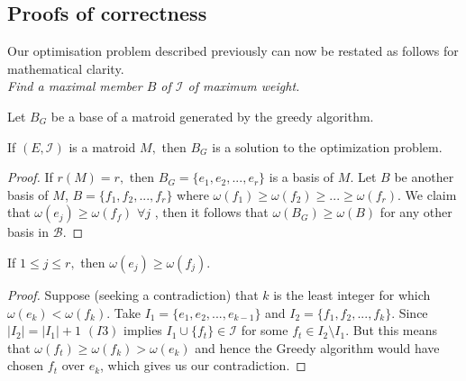 \documentclass[../main.tex]{subfiles}
\begin{document}
\subsection{Proofs of correctness}
Our optimisation problem described previously can now be restated as follows for mathematical clarity.\\
\noindent\Problem \textit{Find a maximal member $B$ of $\mathcal{I}$ of maximum weight.}
\begin{note}
Let $B_G$ be a base of a matroid generated by the greedy algorithm.
\end{note}
\begin{thm}\cite{ox_book}
If $(E,\mathcal{I})$ is a matroid $M,$ then $B_G$ is a solution to the optimization problem.
\end{thm}
\begin{proof}
If $r(M) = r,$ then $B_G = \{e_1,e_2, ..., e_r\}$ is a basis of $M.$ Let $B$ be another basis of $M$, $B = \{f_1, f_2, ..., f_r\}$
where $\omega(f_1) \geq \omega(f_2) \geq ... \geq \omega(f_r).$ We claim that $\omega(e_j) \geq \omega(f_f)$ $ \forall j$ , then it follows that $\omega(B_G) \geq \omega(B)$ for any other basis in $\mathcal{B}.$
\end{proof}

\begin{lem}\cite{ox_book}
If $1 \leq j \leq r,$ then $\omega(e_j) \geq \omega(f_j).$
\end{lem}
\begin{proof}
Suppose (seeking a contradiction) that $k$ is the least integer for which $\omega(e_k) < \omega(f_k).$ Take $I_1 = \{e_1, e_2, ..., e_{k-1}\}$ and $I_2 = \{f_1, f_2, ..., f_{k}\}.$ Since $|I_2| = |I_1|+1$  $(I3)$ implies $I_1 \cup \{f_t\} \in \mathcal{I}$ for some $f_t \in I_2 \setminus I_1.$ But this means that $\omega(f_t) \geq \omega(f_k) > \omega(e_k)$ and hence the Greedy algorithm would have chosen $f_t$ over $e_k$, which gives us our contradiction.
\end{proof}
\end{document}
